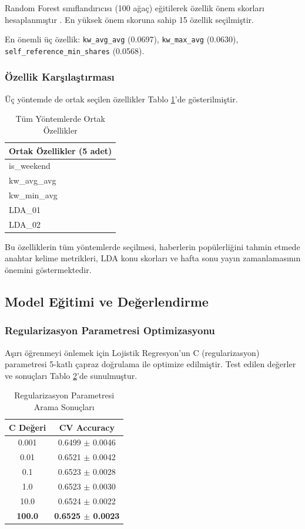 \documentclass[conference]{IEEEtran}
\begin{document}
Random Forest sınıflandırıcısı (100 ağaç) eğitilerek özellik önem skorları hesaplanmıştır \cite{breiman2001random}. En yüksek önem skoruna sahip 15 özellik seçilmiştir.

En önemli üç özellik: \texttt{kw\_avg\_avg} (0.0697), \texttt{kw\_max\_avg} (0.0630), \texttt{self\_reference\_min\_shares} (0.0568).

\subsubsection{Özellik Karşılaştırması}

Üç yöntemde de ortak seçilen özellikler Tablo \ref{tab:common_features}'de gösterilmiştir.

\begin{table}[H]
\centering
\caption{Tüm Yöntemlerde Ortak Özellikler}
\label{tab:common_features}
\begin{tabular}{l}
\toprule
\textbf{Ortak Özellikler (5 adet)} \\
\midrule
is\_weekend \\
kw\_avg\_avg \\
kw\_min\_avg \\
LDA\_01 \\
LDA\_02 \\
\bottomrule
\end{tabular}
\end{table}

Bu özelliklerin tüm yöntemlerde seçilmesi, haberlerin popülerliğini tahmin etmede anahtar kelime metrikleri, LDA konu skorları ve hafta sonu yayın zamanlamasının önemini göstermektedir.

\subsection{Model Eğitimi ve Değerlendirme}

\subsubsection{Regularizasyon Parametresi Optimizasyonu}

Aşırı öğrenmeyi önlemek için Lojistik Regresyon'un C (regularizasyon) parametresi 5-katlı çapraz doğrulama ile optimize edilmiştir. Test edilen değerler ve sonuçları Tablo \ref{tab:regularization}'de sunulmuştur.

\begin{table}[H]
\centering
\caption{Regularizasyon Parametresi Arama Sonuçları}
\label{tab:regularization}
\begin{tabular}{cc}
\toprule
\textbf{C Değeri} & \textbf{CV Accuracy} \\
\midrule
0.001 & 0.6499 $\pm$ 0.0046 \\
0.01 & 0.6521 $\pm$ 0.0042 \\
0.1 & 0.6523 $\pm$ 0.0028 \\
1.0 & 0.6523 $\pm$ 0.0030 \\
10.0 & 0.6524 $\pm$ 0.0022 \\
\textbf{100.0} & \textbf{0.6525 $\pm$ 0.0023} \\
\bottomrule
\end{tabular}
\end{table}
\end{document}
